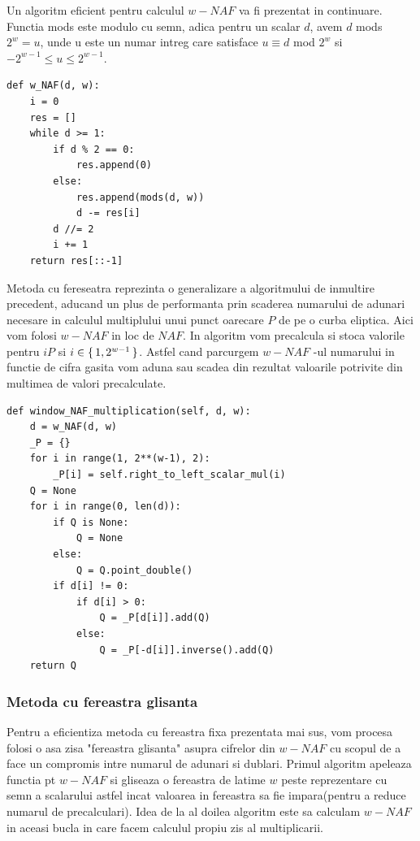 Un algoritm eficient pentru calculul $w-NAF$ va fi prezentat in continuare. Functia mods este modulo cu semn, adica pentru un scalar $d$, avem $d$ mods $2^w=u$, unde u este un numar intreg care satisface $u\equiv d$ mod $2^w$ si $-2^{w-1}\leq u\leq 2^{w-1}$.

\begin{lstlisting}
def w_NAF(d, w):
    i = 0
    res = []
    while d >= 1:
        if d % 2 == 0:
            res.append(0)
        else:
            res.append(mods(d, w))
            d -= res[i]
        d //= 2
        i += 1
    return res[::-1]
\end{lstlisting}

Metoda cu fereseatra reprezinta o generalizare a algoritmului de inmultire precedent, aducand un plus de performanta prin scaderea numarului de adunari necesare in calculul multiplului unui punct oarecare $P$ de pe o curba eliptica. Aici vom folosi $w-NAF$ in loc de $NAF$. In algoritm vom precalcula si stoca valorile pentru $iP$ si $i\in\set{1, 2^{w-1}}$. Astfel cand parcurgem $w-NAF$ -ul numarului in functie de cifra gasita vom aduna sau scadea din rezultat valoarile potrivite din multimea de valori precalculate.

\begin{lstlisting}
def window_NAF_multiplication(self, d, w):
    d = w_NAF(d, w)
    _P = {}
    for i in range(1, 2**(w-1), 2):
        _P[i] = self.right_to_left_scalar_mul(i)
    Q = None
    for i in range(0, len(d)):
        if Q is None:
            Q = None
        else:
            Q = Q.point_double()
        if d[i] != 0:
            if d[i] > 0:
                Q = _P[d[i]].add(Q)
            else:
                Q = _P[-d[i]].inverse().add(Q)
    return Q
\end{lstlisting}

\subsubsection{Metoda cu fereastra glisanta}
Pentru a eficientiza metoda cu fereastra fixa prezentata mai sus, vom procesa folosi o asa zisa "fereastra glisanta" asupra cifrelor din $w-NAF$ cu scopul de a face un compromis intre numarul de adunari si dublari. Primul algoritm apeleaza functia pt $w-NAF$ si gliseaza o fereastra de latime $w$ peste reprezentare cu semn a scalarului astfel incat valoarea in fereastra sa fie impara(pentru a reduce numarul de precalculari). Idea de la al doilea algoritm este sa calculam $w-NAF$ in aceasi bucla in care facem calculul propiu zis al multiplicarii.

